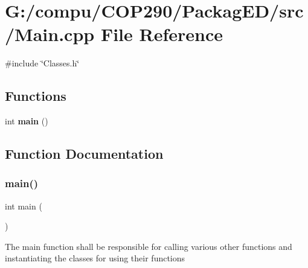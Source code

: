 \section{G\+:/compu/\+C\+O\+P290/\+Packag\+E\+D/src/\+Main.cpp File Reference}
\label{_main_8cpp}
{\ttfamily \#include \char`\"{}Classes.\+h\char`\"{}}\newline
\subsection*{Functions}
\begin{DoxyCompactItemize}
\item 
int \textbf{ main} ()
\end{DoxyCompactItemize}


\subsection{Function Documentation}
\mbox{\label{_main_8cpp_ae66f6b31b5ad750f1fe042a706a4e3d4}} 
\subsubsection{main()}
{\footnotesize\ttfamily int main (\begin{DoxyParamCaption}{ }\end{DoxyParamCaption})}

The main function shall be responsible for calling various other functions and instantiating the classes for using their functions
